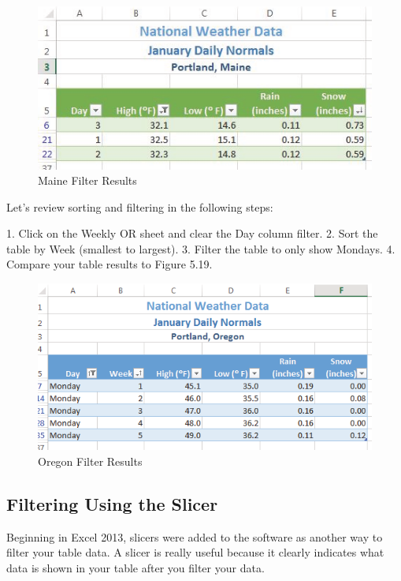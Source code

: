 \begin{figure}[H]
	\centering
	\includegraphics[width=\maxwidth{.95\linewidth}]{gfx/ch05_fig18}
	\caption{Maine Filter Results}
	\label{05:fig18}
\end{figure}




Let’s review sorting and filtering in the following steps:

1.   Click on the Weekly OR sheet and clear the Day column filter.
2.   Sort the table by Week (smallest to largest).
3.   Filter the table to only show Mondays.
4.   Compare your table results to Figure 5.19.

\begin{figure}[H]
	\centering
	\includegraphics[width=\maxwidth{.95\linewidth}]{gfx/ch05_fig19}
	\caption{Oregon Filter Results}
	\label{05:fig19}
\end{figure}



\subsection{Filtering Using the Slicer}

Beginning in Excel 2013, slicers were added to the software as another way to filter your table data. A
slicer is really useful because it clearly indicates what data is shown in your table after you filter your
data.

